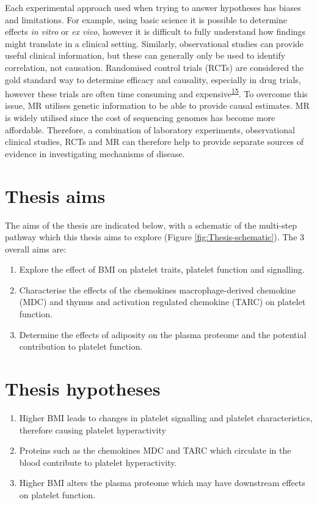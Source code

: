\documentclass[11pt,twoside]{bristolthesis}
\providecommand{\tightlist}{%
  \setlength{\itemsep}{0pt}\setlength{\parskip}{0pt}}
\begin{document}
Each experimental approach used when trying to answer hypotheses has biases and limitations. For example, using basic science it is possible to determine effects \emph{in vitro} or \emph{ex vivo}, however it is difficult to fully understand how findings might translate in a clinical setting. Similarly, observational studies can provide useful clinical information, but these can generally only be used to identify correlation, not causation. Randomised control trials (RCTs) are considered the gold standard way to determine efficacy and causality, especially in drug trials, however these trials are often time consuming and expensive\textsuperscript{\protect\hyperlink{ref-Bennett2017}{15}}. To overcome this issue, MR utilises genetic information to be able to provide causal estimates. MR is widely utilised since the cost of sequencing genomes has become more affordable. Therefore, a combination of laboratory experiments, observational clinical studies, RCTs and MR can therefore help to provide separate sources of evidence in investigating mechanisms of disease.

\hypertarget{thesis-aims}{%
\section{Thesis aims}\label{thesis-aims}}

The aims of the thesis are indicated below, with a schematic of the multi-step pathway which this thesis aims to explore (Figure \ref{fig:Thesis-schematic}). The 3 overall aims are:
\begin{enumerate}
\def\labelenumi{\arabic{enumi})}
\tightlist
\item
  Explore the effect of BMI on platelet traits, platelet function and signalling.
\item
  Characterise the effects of the chemokines macrophage-derived chemokine (MDC) and thymus and activation regulated chemokine (TARC) on platelet function.
\item
  Determine the effects of adiposity on the plasma proteome and the potential contribution to platelet function.
\end{enumerate}
\hypertarget{thesis-hypotheses}{%
\section{Thesis hypotheses}\label{thesis-hypotheses}}
\begin{enumerate}
\def\labelenumi{\arabic{enumi})}
\tightlist
\item
  Higher BMI leads to changes in platelet signalling and platelet characteristics, therefore causing platelet hyperactivity
\item
  Proteins such as the chemokines MDC and TARC which circulate in the blood contribute to platelet hyperactivity.
\item
  Higher BMI alters the plasma proteome which may have downstream effects on platelet function.
\end{enumerate}
\end{document}
